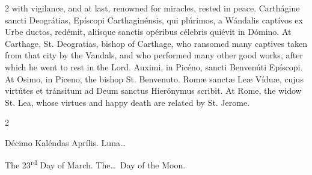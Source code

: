 \begin{paracol}{2}
 with vigilance, and at last, renowned for miracles, rested in peace.
\switchcolumn*
{}
Carthágine sancti Deográtias, Epíscopi Carthaginénsis, qui plúrimos, a 
 Wándalis captívos ex Urbe ductos, redémit, aliísque sanctis opéribus 
 célebris quiévit in Dómino.
\switchcolumn
{}
At Carthage, St. Deogratias, bishop of Carthage, who ransomed many captives 
 taken from that city by the Vandals, and who performed many other good 
 works, after which he went to rest in the Lord.
\switchcolumn*
{}
Auximi, in Picéno, sancti Benvenúti Epíscopi.
\switchcolumn
{}
At Osimo, in Piceno, the bishop St. Benvenuto.
\switchcolumn*
{}
Romæ sanctæ Leæ Víduæ, cujus virtútes et 
 tránsitum ad Deum sanctus Hierónymus scribit.
\switchcolumn
{}
At Rome, the widow St. Lea, whose virtues and happy death are related by St. 
 Jerome.
\switchcolumn*
{}
\end{paracol}


\begin{paracol}{2}
\begin{center}{\color{gregoriocolor} Décimo Kaléndas Aprílis. 
 Luna\dots\ }\end{center}
\switchcolumn
{}
\begin{center}{\color{gregoriocolor} The 23\textsuperscript{rd} Day of March. 
 The\dots\ Day of the Moon.}\end{center}
\end{paracol}

